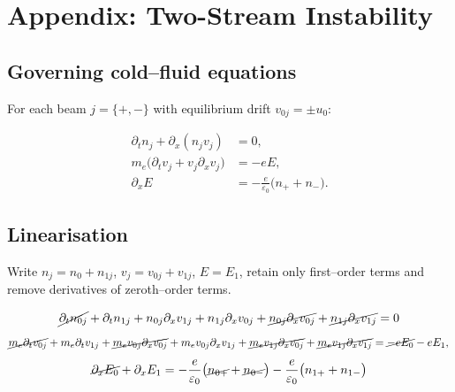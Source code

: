 
\section*{Appendix: Two-Stream Instability}\label{app:A}

\subsection{Governing cold--fluid equations}

For each beam $j=\{+,-\}$ with equilibrium drift $v_{0j}=\pm u_0$:

\begin{align}
    \partial_t n_j + \partial_x (n_j v_j) &= 0, \label{eq:continuity}\\
    m_e\bigl(\partial_t v_j + v_j \partial_x v_j \bigr) &= -e E, \label{eq:momentum}\\
    \partial_x E &= -\frac{e}{\varepsilon_0}\bigl(n_+ + n_- \bigr). \label{eq:poisson}
\end{align}

\subsection{Linearisation}

Write $n_j = n_0 + n_{1j}$, $v_j = v_{0j} + v_{1j}$, $E = E_1$, retain only first--order terms and remove derivatives of zeroth--order terms.

\begin{equation}
    \cancel{\partial_t n_{0j}} + \partial_t n_{1j} + n_{0j} \partial_x v_{1j} + n_{1j} \partial_x v_{0j} + \cancel{n_{0j} \partial_x v_{0j}} + \cancel{n_{1j} \partial_x v_{1j}} = 0 \label{eq:continuity}
\end{equation}
%
\begin{equation}
    \cancel{m_e \partial_t v_{0j}} + m_e \partial_t v_{1j} + \cancel{m_e v_{0j} \partial_x v_{0j}} + m_e v_{0j} \partial_x v_{1j} + \cancel{m_e v_{1j} \partial_x v_{0j}} + \cancel{m_e v_{1j} \partial_x v_{1j}} = \cancel{-e E_0} - e E_1, \label{eq:momentum}\\
\end{equation}
%
\begin{equation}
    \cancel{\partial_x E_0} + \partial_x E_1 = -\frac{e}{\varepsilon_0}\bigl(\cancel{n_{0+}} + \cancel{n_{0-}} \bigr) -\frac{e}{\varepsilon_0}\bigl(n_{1+} + n_{1-} \bigr)\label{eq:poisson}
\end{equation}

